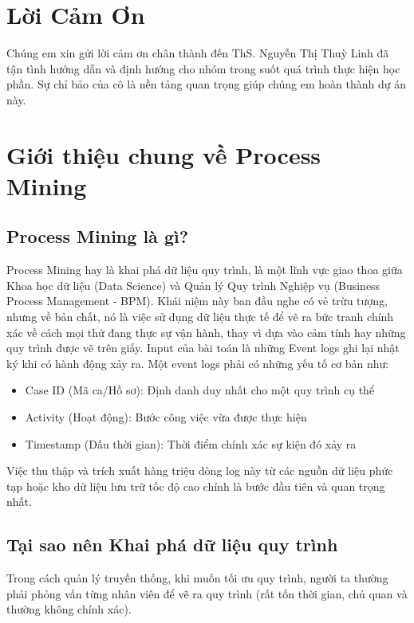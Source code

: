 \documentclass[a4paper,12pt]{article}
\begin{document}
\section*{Lời Cảm Ơn}
Chúng em xin gửi lời cảm ơn chân thành đến ThS. Nguyễn Thị Thuỳ Linh đã tận tình hướng dẫn và định hướng cho nhóm trong suốt quá trình thực hiện học phần. Sự chỉ bảo của cô là nền tảng quan trọng giúp chúng em hoàn thành dự án này.

\newpage
\tableofcontents
\newpage


\section{Giới thiệu chung về Process Mining}

\subsection{Process Mining là gì?}
Process Mining hay là khai phá dữ liệu quy trình, là một lĩnh vực giao thoa giữa Khoa học dữ liệu (Data Science) và Quản lý Quy trình Nghiệp vụ (Business Process Management - BPM). Khái niệm này ban đầu nghe có vẻ trừu tượng, nhưng về bản chất, nó là việc sử dụng dữ liệu thực tế để vẽ ra bức tranh chính xác về cách mọi thứ đang thực sự vận hành, thay vì dựa vào cảm tính hay những quy trình được vẽ trên giấy.
Input của bài toán là những Event logs ghi lại nhật ký khi có hành động xảy ra. Một event logs phải có những yếu tố cơ bản như:
\begin{itemize}
    \item Case ID (Mã ca/Hồ sơ): Định danh duy nhất cho một quy trình cụ thể
    \item Activity (Hoạt động): Bước công việc vừa được thực hiện
    \item Timestamp (Dấu thời gian): Thời điểm chính xác sự kiện đó xảy ra
\end{itemize}
Việc thu thập và trích xuất hàng triệu dòng log này từ các nguồn dữ liệu phức tạp hoặc kho dữ liệu lưu trữ tốc độ cao chính là bước đầu tiên và quan trọng nhất.

\subsection{Tại sao nên Khai phá dữ liệu quy trình}
Trong cách quản lý truyền thống, khi muốn tối ưu quy trình, người ta thường phải phỏng vấn từng nhân viên để vẽ ra quy trình (rất tốn thời gian, chủ quan và thường không chính xác).
\end{document}
